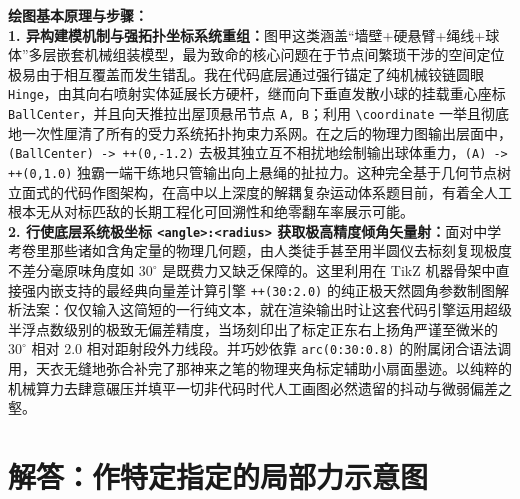 \vspace{0.6cm}

{\small\color{blue!70!black}
\textbf{绘图基本原理与步骤：}\\
\textbf{1. 异构建模机制与强拓扑坐标系统重组：}图甲这类涵盖“墙壁+硬悬臂+绳线+球体”多层嵌套机械组装模型，最为致命的核心问题在于节点间繁琐干涉的空间定位极易由于相互覆盖而发生错乱。我在代码底层通过强行锚定了纯机械铰链圆眼 \texttt{Hinge}，由其向右喷射实体延展长方硬杆，继而向下垂直发散小球的挂载重心座标 \texttt{BallCenter}，并且向天推拉出屋顶悬吊节点 \texttt{A, B}；利用 \texttt{\textbackslash coordinate} 一举且彻底地一次性厘清了所有的受力系统拓扑拘束力系网。在之后的物理力图输出层面中，\texttt{(BallCenter) -> ++(0,-1.2)} 去极其独立互不相扰地绘制输出球体重力，\texttt{(A) -> ++(0,1.0)} 独霸一端干练地只管输出向上悬绳的扯拉力。这种完全基于几何节点树立面式的代码作图架构，在高中以上深度的解耦复杂运动体系题目前，有着全人工根本无从对标匹敌的长期工程化可回溯性和绝零翻车率展示可能。\\
\textbf{2. 行使底层系统极坐标 \texttt{<angle>:<radius>} 获取极高精度倾角矢量射：}面对中学考卷里那些诸如含角定量的物理几何题，由人类徒手甚至用半圆仪去标刻复现极度不差分毫原味角度如 $30^{\circ}$ 是既费力又缺乏保障的。这里利用在 TikZ 机器骨架中直接强内嵌支持的最经典向量差计算引擎 \texttt{++(30:2.0)} 的纯正极天然圆角参数制图解析法案：仅仅输入这简短的一行纯文本，就在渲染输出时让这套代码引擎运用超级半浮点数级别的极致无偏差精度，当场刻印出了标定正东右上扬角严谨至微米的 $30^{\circ}$ 相对 $2.0$ 相对距射段外力线段。并巧妙依靠 \texttt{arc(0:30:0.8)} 的附属闭合语法调用，天衣无缝地弥合补完了那神来之笔的物理夹角标定辅助小扇面墨迹。以纯粹的机械算力去肆意碾压并填平一切非代码时代人工画图必然遗留的抖动与微弱偏差之壑。
}





\section{解答：作特定指定的局部力示意图}

\vspace{0.6cm}

